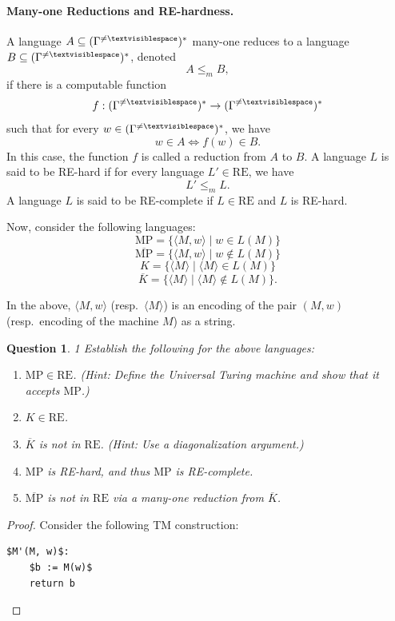 \documentclass{article}
\newtheorem{question}[theorem]{Question}
\begin{document}
\paragraph{Many-one Reductions and RE-hardness.}
A language $A \subseteq (\Gamma^{\neq \textvisiblespace})^*$ many-one reduces to a language $B \subseteq (\Gamma^{\neq \textvisiblespace})^*$, denoted
\[
A \le_m B,
\]
if there is a computable function
\[
f : (\Gamma^{\neq \textvisiblespace})^* \to (\Gamma^{\neq \textvisiblespace})^*
\]
such that for every $w \in (\Gamma^{\neq \textvisiblespace})^*$, we have
\[
w \in A \iff f(w) \in B.
\]
In this case, the function $f$ is called a reduction from $A$ to $B$. A language $L$ is said to be RE-hard if for every language $L' \in \mathrm{RE}$, we have
\[
L' \le_m L.
\]
A language $L$ is said to be RE-complete if $L \in \mathrm{RE}$ and $L$ is RE-hard.

Now, consider the following languages:
\[
\mathrm{MP} = \{\langle M,w\rangle \mid w \in L(M)\}
\]
\[
\overline{\mathrm{MP}} = \{\langle M,w\rangle \mid w \notin L(M)\}
\]
\[
K = \{\langle M\rangle \mid \langle M\rangle \in L(M)\}
\]
\[
\overline{K} = \{\langle M\rangle \mid \langle M\rangle \notin L(M)\}.
\]

In the above, $\langle M,w\rangle$ (resp.\ $\langle M\rangle$) is an encoding of the pair $(M,w)$ (resp.\ encoding of the machine $M$) as a string.

\begin{question}{1}
Establish the following for the above languages:
\begin{enumerate}
    \item $\mathrm{MP} \in \mathrm{RE}$. \emph{(Hint: Define the Universal Turing machine and show that it accepts $\mathrm{MP}$.)}
    \item $K \in \mathrm{RE}$.
    \item $\overline{K}$ is not in $\mathrm{RE}$. \emph{(Hint: Use a diagonalization argument.)}
    \item $\mathrm{MP}$ is RE-hard, and thus $\mathrm{MP}$ is RE-complete.
    \item $\overline{\mathrm{MP}}$ is not in $\mathrm{RE}$ via a many-one reduction from $\overline{K}$.
\end{enumerate}
\end{question}

\begin{proof}
    Consider the following TM construction: 
    \begin{lstlisting}[mathescape=true]
$M'(M, w)$:
    $b := M(w)$
    return b
    \end{lstlisting}
\end{proof}
\end{document}
